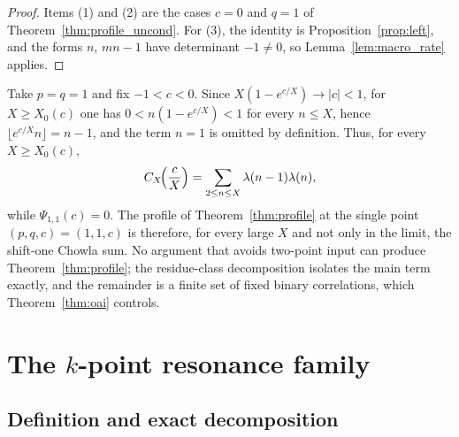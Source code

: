 \begin{proof}
Items (1) and (2) are the cases $c=0$ and $q=1$ of Theorem~\ref{thm:profile_uncond}. For (3), the identity is Proposition~\ref{prop:left}, and the forms $n$, $mn-1$ have determinant $-1\ne0$, so Lemma~\ref{lem:macro_rate} applies.
\end{proof}

\begin{remark}
\label{rem:trivial_resonance}
Take $p=q=1$ and fix $-1<c<0$. Since $X(1-e^{c/X})\to|c|<1$, for $X\ge X_0(c)$ one has $0<n(1-e^{c/X})<1$ for every $n\le X$, hence $\lfloor e^{c/X}n\rfloor=n-1$, and the term $n=1$ is omitted by definition. Thus, for every $X\ge X_0(c)$,
\begin{equation}
C_X\!\Bigl(\frac cX\Bigr)=\sum_{2\le n\le X}\lambda(n-1)\lambda(n),
\label{eq:trivial_resonance}
\end{equation}
while $\Psi_{1,1}(c)=0$. The profile of Theorem~\ref{thm:profile} at the single point $(p,q,c)=(1,1,c)$ is therefore, for every large $X$ and not only in the limit, the shift-one Chowla sum. No argument that avoids two-point input can produce Theorem~\ref{thm:profile}; the residue-class decomposition isolates the main term exactly, and the remainder is a finite set of fixed binary correlations, which Theorem~\ref{thm:oai} controls.
\end{remark}


\section{The \texorpdfstring{$k$}{k}-point resonance family}
\label{sec:kpoint}

\subsection{Definition and exact decomposition}
\label{subsec:kpoint_def}

